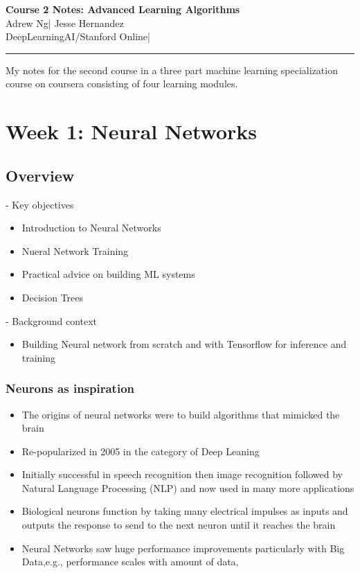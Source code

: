 \documentclass[11pt,letterpaper]{article}
\begin{document}
\begin{center}
    {\LARGE \textbf{Course 2 Notes: Advanced Learning Algorithms}}\\[0.5em]
    {\large Adrew Ng\quad | \quad Jesse Hernandez}\\[0.25em]
    {\small DeepLearningAI/Stanford Online\quad | }
\end{center}

\vspace{1em}
\hrule
\vspace{1em}

{\noindent\Large \color{blue} My notes for the second course in a three part machine learning specialization course on coursera consisting of four learning modules.}

\section{Week 1: Neural Networks}

\subsection{Overview}

- Key objectives  
\begin{itemize}
	\item Introduction to Neural Networks
	\item Nueral Network Training
	\item Practical advice on building ML systems
	\item Decision Trees
\end{itemize}

\noindent 
- Background context  
\begin{itemize}
	\item Building Neural network from scratch and with Tensorflow for inference and training
\end{itemize}

\subsubsection{Neurons as inspiration}

\begin{notebox}
	\begin{itemize}[leftmargin=*]
		\item The origins of neural networks were to build algorithms that mimicked the brain
		\item Re-popularized in 2005 in the category of Deep Leaning
		\item Initially successful in speech recognition then image recognition followed by Natural Language Processing (NLP) and now used in many more applications
		\item Biological neurons function by taking many electrical impulses as inputs and outputs the response to send to the next neuron until it reaches the brain 
		\item Neural Networks saw huge performance improvements particularly with Big Data,e.g., performance scales with amount of data,  
	\end{itemize}
\end{notebox}
\end{document}
